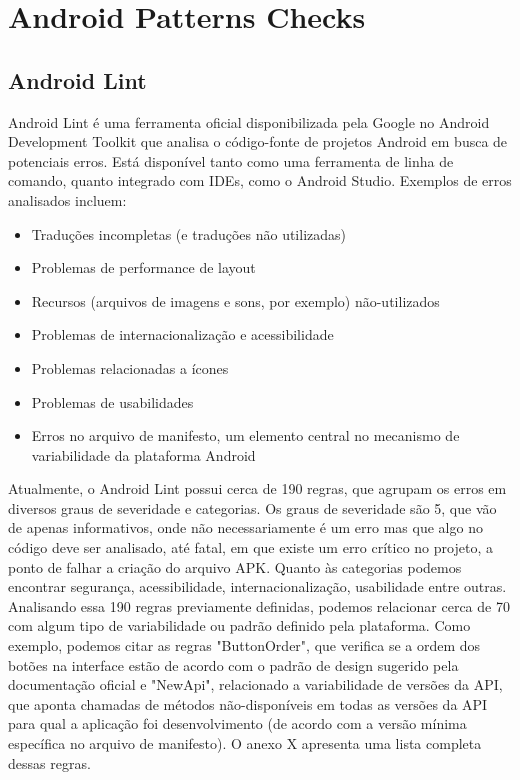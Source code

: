 \chapter{Android Patterns Checks}
\label{android_lint}
\section{Android Lint}

Android Lint é uma ferramenta oficial disponibilizada pela Google no Android 
Development Toolkit que analisa o código-fonte de projetos Android em busca de 
potenciais erros. Está disponível tanto como uma ferramenta de linha de comando, 
quanto integrado com IDEs, como o Android Studio. Exemplos de erros analisados incluem:

\begin{itemize}
  \item{Traduções incompletas (e traduções não utilizadas)}
  \item{Problemas de performance de layout}
  \item{Recursos (arquivos de imagens e sons, por exemplo) não-utilizados}
  \item{Problemas de internacionalização e acessibilidade}
  \item{Problemas relacionadas a ícones}
  \item{Problemas de usabilidades}
  \item{Erros no arquivo de manifesto, um elemento central no mecanismo de variabilidade
  da plataforma Android \cite{mechanisms}}
\end{itemize}

Atualmente, o Android Lint possui cerca de 190 regras, que agrupam os erros em 
diversos graus de severidade e categorias. Os graus de severidade são 5, que vão 
de apenas informativos, onde não necessariamente é um erro mas que algo no código 
deve ser analisado, até fatal, em que existe um erro crítico no projeto, a ponto 
de falhar a criação do arquivo APK. Quanto às categorias podemos encontrar segurança, 
acessibilidade, internacionalização, usabilidade entre outras. Analisando essa 190 
regras previamente definidas, podemos relacionar cerca de 70 com algum tipo de 
variabilidade ou padrão definido pela plataforma. Como exemplo, podemos citar as 
regras "ButtonOrder", que verifica se a ordem dos botões na interface estão de 
acordo com o padrão de design sugerido pela documentação oficial e "NewApi", 
relacionado a variabilidade de versões da API, que aponta chamadas de métodos 
não-disponíveis em todas as versões da API para qual a aplicação foi desenvolvimento 
(de acordo com a versão mínima específica no arquivo de manifesto). O anexo X 
apresenta uma lista completa dessas regras. %

